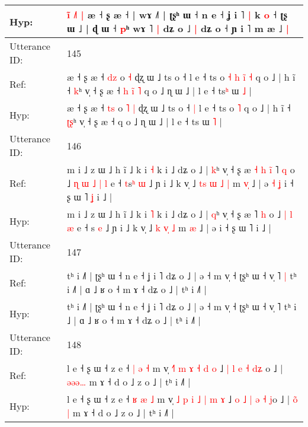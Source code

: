 \documentclass[10pt]{article}
\DeclareRobustCommand{\hl}[1]{{\textcolor{red}{#1}}}
\begin{document}
\begin{longtable}{ll}
 \\
Hyp: & \hl{i}\hl{̃} \hl{˩}\hl{˥} \hl{|} æ ˧ ʂ æ ˧ | wɤ ˩˥ | ʈʂʰ ɯ ˧ n e ˧ ʝ i ˥\hl{ }\hl{|} k \hl{o} ˧ ʈʂ ɯ ˩ | ɖ ɯ ˧ \hl{p}ʰ wɤ ˥\hl{ }\hl{|} dʑ o ˩\hl{ }\hl{|} dʑ o ˧ ɲ i ˥ m æ ˩\hl{ }\hl{|}
 \\
\midrule
Utterance ID: & 145 \\
Ref: & æ ˧ ʂ æ ˧ \hl{d}\hl{z} o\hl{}\hl{} \hl{˧} ɖʐ ɯ ˩ ts o ˧\hl{}\hl{} l e ˧ ts o\hl{ }\hl{˧}\hl{ }\hl{h}\hl{ }\hl{i}\hl{̃} \hl{˧} q o ˩ | h ĩ ˧ \hl{}\hl{k}ʰ v̩ ˧ ʂ æ ˧\hl{ }\hl{h}\hl{ }\hl{ĩ}\hl{ }\hl{˥} q o ˩ ɳ ɯ ˩ | l e ˧ ts\hl{ʰ} ɯ \hl{˩} |
 \\
Hyp: & æ ˧ ʂ æ ˧ \hl{t}\hl{s} o\hl{ }\hl{˥} \hl{|} ɖʐ ɯ ˩ ts o ˧\hl{ }\hl{|} l e ˧ ts o\hl{}\hl{}\hl{}\hl{}\hl{}\hl{}\hl{} \hl{˥} q o ˩ | h ĩ ˧ \hl{ʈ}\hl{ʂ}ʰ v̩ ˧ ʂ æ ˧\hl{}\hl{}\hl{}\hl{}\hl{}\hl{} q o ˩ ɳ ɯ ˩ | l e ˧ ts\hl{} ɯ \hl{˥} |
 \\
\midrule
Utterance ID: & 146 \\
Ref: & m i ˩ z ɯ ˩ h ĩ ˩ k i \hl{˧} k i ˩ dʑ o ˩ | \hl{k}ʰ v̩ ˧ ʂ æ\hl{ }\hl{˧}\hl{ }\hl{h}\hl{ }\hl{ĩ} ˥ \hl{q} o ˩\hl{ }\hl{ɳ}\hl{ }\hl{ɯ} \hl{˩} \hl{|} \hl{l} e ˧ \hl{t}s\hl{ʰ} \hl{ɯ} ˩ ɲ i ˩ k v̩ ˩ \hl{t}\hl{s} \hl{ɯ}\hl{ }\hl{˩} \hl{|} m \hl{v}\hl{̩} ˩ | ə\hl{ }\hl{˧}\hl{ }\hl{ʝ} i ˧ ʂ ɯ ˥\hl{ }\hl{ʝ} i ˩ |
 \\
Hyp: & m i ˩ z ɯ ˩ h ĩ ˩ k i \hl{˥} k i ˩ dʑ o ˩ | \hl{q}ʰ v̩ ˧ ʂ æ\hl{}\hl{}\hl{}\hl{}\hl{}\hl{} ˥ \hl{h} o ˩\hl{}\hl{}\hl{}\hl{} \hl{|} \hl{l} \hl{æ} e ˧ \hl{}s\hl{} \hl{e} ˩ ɲ i ˩ k v̩ ˩ \hl{}\hl{k} \hl{}\hl{v}\hl{̩} \hl{˩} m \hl{}\hl{æ} ˩ | ə\hl{}\hl{}\hl{}\hl{} i ˧ ʂ ɯ ˥\hl{}\hl{} i ˩ |
 \\
\midrule
Utterance ID: & 147 \\
Ref: & tʰ i ˩˥ | ʈʂʰ ɯ ˧ n e ˧ ʝ i ˥ dʑ o ˩ | ə ˧ m v̩ ˧ ʈʂʰ ɯ ˧ v̩ ˥\hl{ }\hl{|} tʰ i ˩\hl{˥} | ɑ ˩ ʁ o ˧ m ɤ ˧ dʑ o ˩ | tʰ i ˩˥ |
 \\
Hyp: & tʰ i ˩˥ | ʈʂʰ ɯ ˧ n e ˧ ʝ i ˥ dʑ o ˩ | ə ˧ m v̩ ˧ ʈʂʰ ɯ ˧ v̩ ˥\hl{}\hl{} tʰ i ˩\hl{} | ɑ ˩ ʁ o ˧ m ɤ ˧ dʑ o ˩ | tʰ i ˩˥ |
 \\
\midrule
Utterance ID: & 148 \\
Ref: & l e ˧ ʂ ɯ ˧ z e ˧ \hl{|} \hl{ə} \hl{˧} m v̩ \hl{}\hl{˧}\hl{˥} \hl{m} \hl{ɤ} \hl{˧} \hl{d} \hl{o} ˩ \hl{|} \hl{l} \hl{e} \hl{˧} \hl{d}\hl{ʑ}\hl{ }o ˩ | \hl{ə}\hl{ə}\hl{ə}\hl{…} m ɤ ˧ d o ˩ z o ˩ | tʰ i ˩˥ |
 \\
Hyp: & l e ˧ ʂ ɯ ˧ z e ˧ \hl{ʁ} \hl{æ} \hl{˩} m v̩ \hl{˩}\hl{ }\hl{p} \hl{i} \hl{˩} \hl{|} \hl{m} \hl{ɤ} ˩ \hl{o} \hl{˩} \hl{|} \hl{ə} \hl{˧}\hl{ }\hl{j}o ˩ | \hl{o}\hl{̃}\hl{ }\hl{|} m ɤ ˧ d o ˩ z o ˩ | tʰ i ˩˥ |

\end{longtable}
\end{document}
